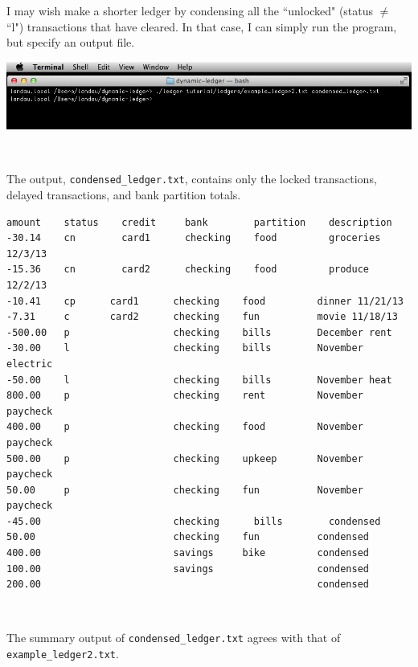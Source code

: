 \documentclass{article}
\providecommand{\q}{$\quad$ \newline}
\begin{document}
\begin{flushleft}
I may wish make a shorter ledger by condensing all the ``unlocked" (status $\ne$ ``l") transactions that have cleared.  In that case, I can simply run the program, but specify an output file. \q


\begin{center}
\includegraphics[scale=.5]{fig/condense.png}
\end{center} \q

The output, {\tt condensed\_ledger.txt}, contains only the locked transactions, delayed transactions, and bank partition totals. \q

\begin{lstlisting}[title=condensed\_ledger.txt]
amount    status	credit     bank        partition    description
-30.14    cn	    card1      checking    food         groceries 12/3/13
-15.36    cn	    card2      checking    food         produce 12/2/13
-10.41    cp      card1      checking    food         dinner 11/21/13
-7.31     c       card2      checking    fun          movie 11/18/13
-500.00   p                  checking    bills        December rent
-30.00    l	                 checking    bills        November electric
-50.00    l	                 checking    bills        November heat
800.00    p                  checking    rent         November paycheck
400.00    p                  checking    food         November paycheck
500.00    p                  checking    upkeep       November paycheck
50.00     p                  checking    fun          November paycheck
-45.00                       checking	   bills        condensed
50.00                        checking    fun          condensed
400.00                       savings     bike         condensed
100.00                       savings                  condensed
200.00                                                condensed
\end{lstlisting} \q

The summary output of {\tt condensed\_ledger.txt} agrees with that of  {\tt example\_ledger2.txt}.


\end{flushleft}
\end{document}
